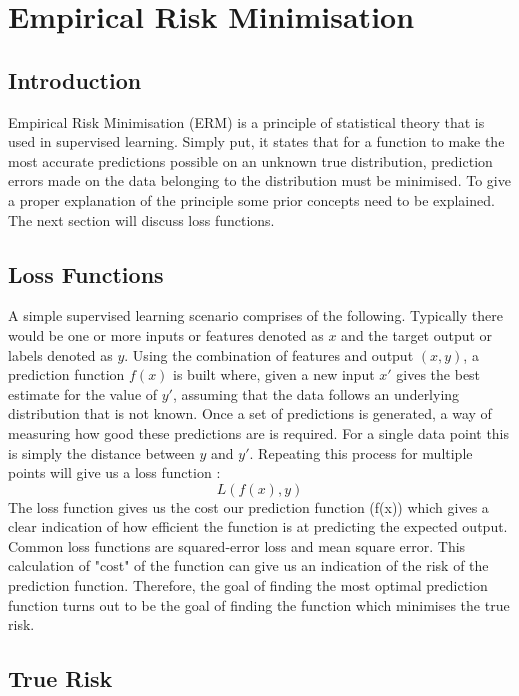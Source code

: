\chapter{Empirical Risk Minimisation}
\label{ch:empirical-risk-minimisation}

\section{Introduction}
Empirical Risk Minimisation (ERM) is a principle of statistical theory that is used in supervised learning. Simply put, it states that for a function to make the most accurate predictions possible on an unknown true distribution, prediction errors made on the data belonging to the distribution must be minimised. To give a proper explanation of the principle some prior concepts need to be explained. The next section will discuss loss functions. 

\section{Loss Functions}
A simple supervised learning scenario comprises of the following. Typically there would be one or more inputs or features denoted as $x$ and the target output or labels denoted as $y$.
Using the combination of features and output $(x,y)$, a prediction function $f(x)$ is built where, given a new input $x'$ gives the best estimate for the value of $y'$, assuming that the data follows an underlying distribution that is not known. Once a set of predictions is generated, a way of measuring how good these predictions are is required. For a single data point this is simply the distance between $y$ and $y'$. Repeating this process for multiple points will give us a loss function \citep{Wehenkel2018}:
\begin{equation}
    L(f(x),y)
\end{equation}
The loss function gives us the cost our prediction function (f(x)) which gives a clear indication of how efficient the function is at predicting the expected output. Common loss functions are squared-error loss  and mean square error. This calculation of "cost" of the function can give us an indication of the risk of the prediction function. Therefore, the goal of finding the most optimal prediction function turns out to be the goal of finding the function which minimises the true risk.

\section{True Risk}

